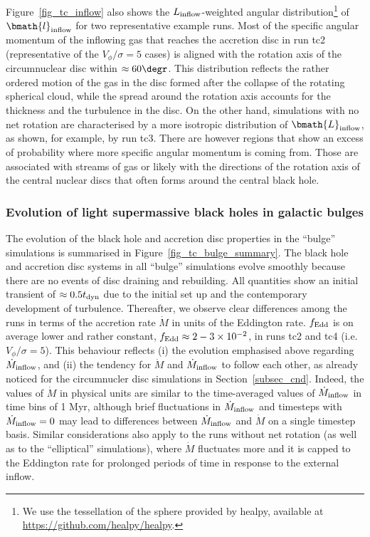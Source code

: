 \documentclass[a4paper,fleqn,usenatbib]{mnras}
\begin{document}
Figure~\ref{fig_tc_inflow} also shows the $L_{\rm inflow}$-weighted angular distribution\footnote{We use the tessellation of the sphere provided by {\sc healpy}, available at \url{https://github.com/healpy/healpy}.} of $\bmath{l}_{\rm inflow}$ for two representative example runs.
Most of the specific angular momentum of the inflowing gas that reaches the accretion disc in run tc2 (representative of the $V_{\phi}/\sigma = 5$ cases) is aligned with the rotation axis of the circumnuclear disc within $\approx 60\degr$.
This distribution reflects the rather ordered motion of the gas in the disc formed after the collapse of the rotating spherical cloud, while the spread around the rotation axis accounts for the thickness and the turbulence in the disc.
On the other hand, simulations with no net rotation are characterised by a more isotropic distribution of $\bmath{L}_{\rm inflow}$, as shown, for example, by run tc3.
There are however regions that show an excess of probability where more specific angular momentum is coming from.
Those are associated with streams of gas or likely with the directions of the rotation axis of the central nuclear discs that often forms around the central black hole.

\subsubsection{Evolution of light supermassive black holes in galactic bulges}

The evolution of the black hole and accretion disc properties in the ``bulge'' simulations is summarised in Figure~\ref{fig_tc_bulge_summary}.
The black hole and accretion disc systems in all ``bulge'' simulations evolve smoothly because there are no events of disc draining and rebuilding.
All quantities show an initial transient of $\approx 0.5 t_{\rm dyn}$ due to the initial set up and the contemporary development of turbulence.
Thereafter, we observe clear differences among the runs in terms of the accretion rate $\dot{M}$ in units of the Eddington rate.
$f_{\rm Edd}$ is on average lower and rather constant, $f_{\rm Edd} \approx 2-3 \times 10^{-2}$, in runs tc2 and tc4 (i.e. $V_{\phi} / \sigma = 5$).
This behaviour reflects (i) the evolution emphasised above regarding $\dot{M}_{\rm inflow}$, and (ii) the tendency for $\dot{M}$ and $\dot{M}_{\rm inflow}$ to follow each other, as already noticed for the circumnucler disc simulations in Section~\ref{subsec_cnd}.
Indeed, the values of $\dot{M}$ in physical units are similar to the time-averaged values of $\dot{M}_{\rm inflow}$ in time bins of 1 Myr, although brief fluctuations in $\dot{M}_{\rm inflow}$ and timesteps with $\dot{M}_{\rm inflow} = 0$ may lead to differences between $\dot{M}_{\rm inflow}$ and $\dot{M}$ on a single timestep basis.
Similar considerations also apply to the runs without net rotation (as well as to the ``elliptical'' simulations), where $\dot{M}$ fluctuates more and it is capped to the Eddington rate for prolonged periods of time in response to the external inflow.
\end{document}
